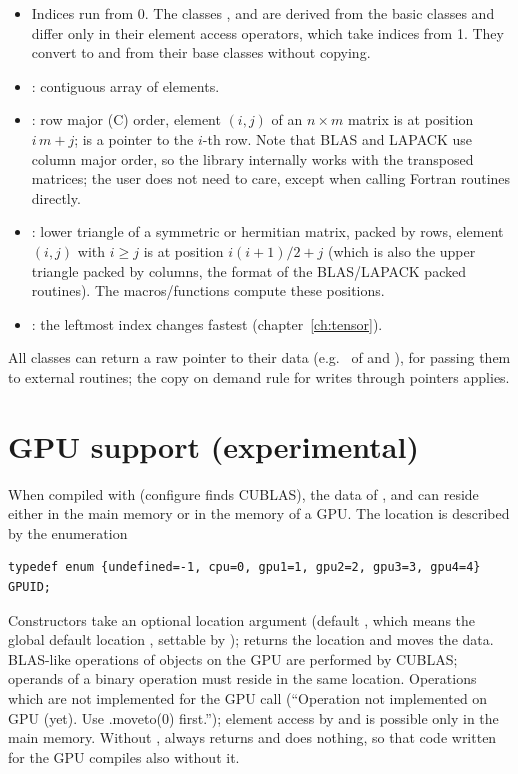 \begin{itemize}
\item Indices run from 0. The classes ,  and  are
	derived from the basic classes and differ only in their element access operators, which take indices from 1.
	They convert to and from their base classes without copying.
\item {}: contiguous array of  elements.
\item {}: row major (C) order, element $(i,j)$ of an $n\times m$ matrix is at position $i\,m+j$;
	 is a pointer to the $i$-th row. Note that BLAS and LAPACK use column major order, so the
	library internally works with the transposed matrices; the user does not need to care, except when calling
	Fortran routines directly.
\item {}: lower triangle of a symmetric or hermitian matrix, packed by rows, element $(i,j)$ with
	$i \ge j$ is at position $i(i+1)/2+j$ (which is also the upper triangle packed by columns, the format of the
	BLAS/LAPACK packed routines). The macros/functions  compute these positions.
\item {}: the leftmost index changes fastest (chapter~\ref{ch:tensor}).
\end{itemize}
All classes can return a raw pointer to their data (e.g.\  of  and ),
for passing them to external routines; the copy on demand rule for writes through pointers applies.

\section{GPU support (experimental)}\label{sec:concepts:gpu}

When compiled with  (configure finds CUBLAS), the data of ,  and
 can reside either in the main memory or in the memory of a GPU. The location is described by
the enumeration
\begin{lstlisting}
typedef enum {undefined=-1, cpu=0, gpu1=1, gpu2=2, gpu3=3, gpu4=4} GPUID;
\end{lstlisting}
Constructors take an optional location argument (default , which means the global default
location , settable by );  returns the location
and  moves the data. BLAS-like operations of objects on the GPU are performed by CUBLAS;
operands of a binary operation must reside in the same location. Operations which are not implemented for the
GPU call  (``Operation not implemented on GPU (yet). Use .moveto(0) first.''); element access
by  and  is possible only in the main memory. Without ,
 always returns  and  does nothing, so that code written for
the GPU compiles also without it.

